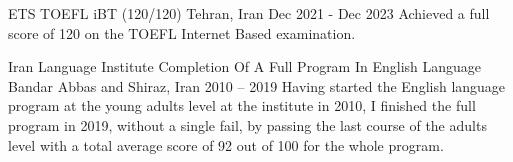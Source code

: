 

\begin{cventries}

   \cventry
    {ETS} %
    {TOEFL iBT (120/120)} %
    {Tehran, Iran} %
    {Dec 2021 - Dec 2023} %
    {
      Achieved a full score of 120 on the TOEFL Internet Based examination.
    }
  
  \cventry
    {Iran Language Institute} %
    {Completion Of A Full Program In English Language} %
    {Bandar Abbas and Shiraz, Iran} %
    {2010 – 2019} %
    {
      Having started the English language program at the young adults level at the institute in 2010, I finished the full program in 2019, without a single fail, by passing the last course of the adults level with a total average score of 92 out of 100 for the whole program.
    }


\end{cventries}
